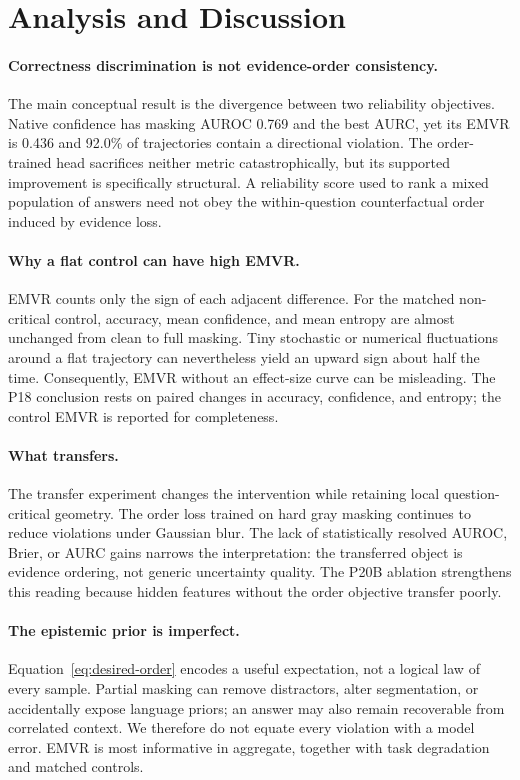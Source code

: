 \section{Analysis and Discussion}
\label{sec:analysis}

\paragraph{Correctness discrimination is not evidence-order consistency.}
The main conceptual result is the divergence between two reliability objectives. Native confidence has masking AUROC 0.769 and the best AURC, yet its EMVR is 0.436 and 92.0\% of trajectories contain a directional violation. The order-trained head sacrifices neither metric catastrophically, but its supported improvement is specifically structural. A reliability score used to rank a mixed population of answers need not obey the within-question counterfactual order induced by evidence loss.

\paragraph{Why a flat control can have high EMVR.}
EMVR counts only the sign of each adjacent difference. For the matched non-critical control, accuracy, mean confidence, and mean entropy are almost unchanged from clean to full masking. Tiny stochastic or numerical fluctuations around a flat trajectory can nevertheless yield an upward sign about half the time. Consequently, EMVR without an effect-size curve can be misleading. The P18 conclusion rests on paired changes in accuracy, confidence, and entropy; the control EMVR is reported for completeness.

\paragraph{What transfers.}
The transfer experiment changes the intervention while retaining local question-critical geometry. The order loss trained on hard gray masking continues to reduce violations under Gaussian blur. The lack of statistically resolved AUROC, Brier, or AURC gains narrows the interpretation: the transferred object is evidence ordering, not generic uncertainty quality. The P20B ablation strengthens this reading because hidden features without the order objective transfer poorly.

\paragraph{The epistemic prior is imperfect.}
Equation~\ref{eq:desired-order} encodes a useful expectation, not a logical law of every sample. Partial masking can remove distractors, alter segmentation, or accidentally expose language priors; an answer may also remain recoverable from correlated context. We therefore do not equate every violation with a model error. EMVR is most informative in aggregate, together with task degradation and matched controls.

